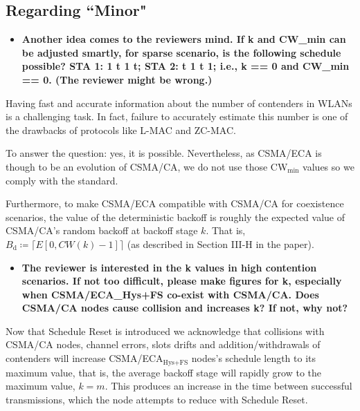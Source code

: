 \documentclass[]{article}
\begin{document}
	\subsection{Regarding ``Minor"}
		\begin{itemize}
			\item {\bfseries Another idea comes to the reviewers mind. If k and CW\_min can be adjusted smartly, for sparse scenario, is the following schedule possible?
    					STA 1:  1   t   1   t;
     					STA 2:  t   1   t   1; 
			i.e., k == 0 and CW\_min == 0. (The reviewer might be wrong.)}
		\end{itemize}
		
		Having fast and accurate information about the number of contenders in WLANs is a challenging task. In fact, failure to accurately estimate this number is one of the drawbacks of protocols like L-MAC and ZC-MAC.
		
		To answer the question: yes, it is possible. Nevertheless, as CSMA/ECA is though to be an evolution of CSMA/CA, we do not use those CW$_{\min}$ values so we comply with the standard. 
		
		Furthermore, to make CSMA/ECA compatible with CSMA/CA for coexistence scenarios, the value of the deterministic backoff is roughly the expected value of CSMA/CA's random backoff at backoff stage $k$. That is, $B_{\text{d}}\coloneqq\lceil{E[0,CW(k)-1]}\rceil$ (as described in Section III-H in the paper).
		
		\begin{itemize}
			\item {\bfseries The reviewer is interested in the k values in high contention scenarios. If not too difficult, please make figures for k, especially when CSMA/ECA\_{Hys+FS} co-exist with CSMA/CA. Does CSMA/CA nodes cause collision and increases k? If not, why not?}
		\end{itemize}
		
		Now that Schedule Reset is introduced we acknowledge that collisions with CSMA/CA nodes, channel errors, slots drifts and addition/withdrawals of contenders will increase CSMA/ECA$_{\text{Hys+FS}}$ nodes's schedule length to its maximum value, that is, the average backoff stage will rapidly grow to the maximum value, $k=m$. This produces an increase in the time between successful transmissions, which the node attempts to reduce with Schedule Reset.
		
%		
		


\end{document}
